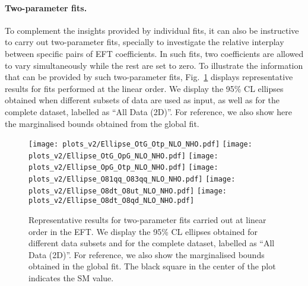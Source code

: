 
\paragraph{Two-parameter fits.}
%
To complement the insights provided by individual fits, it can also be instructive
to carry out two-parameter fits, specially to investigate the relative
interplay between specific pairs of EFT coefficients.
%
In such fits, two coefficients are allowed to vary simultaneously
while the rest are set to zero.
%
To illustrate the information that can be provided
by such two-parameter fits, Fig.~\ref{fig:2Dfits} displays
representative results for fits performed at the linear order.
%
We display the 95\% CL ellipses obtained when different subsets of data are used as input,
as well as for the complete dataset, labelled as ``All Data (2D)''.
%
For reference, we also show here the marginalised bounds obtained
from the global fit.

\begin{figure}[t]
  \begin{center}
    \texttt{[image: plots\_v2/Ellipse\_OtG\_Otp\_NLO\_NHO.pdf]}
    \texttt{[image: plots\_v2/Ellipse\_OtG\_OpG\_NLO\_NHO.pdf]}
    \texttt{[image: plots\_v2/Ellipse\_OpG\_Otp\_NLO\_NHO.pdf]}
    \texttt{[image: plots\_v2/Ellipse\_O81qq\_O83qq\_NLO\_NHO.pdf]}
    \texttt{[image: plots\_v2/Ellipse\_O8dt\_O8ut\_NLO\_NHO.pdf]}
    \texttt{[image: plots\_v2/Ellipse\_O8dt\_O8qd\_NLO\_NHO.pdf]}
    \vspace{-0.2cm}
    \caption{\small Representative results for two-parameter fits carried out
      at linear order in the EFT.
      We display the 95\% CL ellipses obtained for different data subsets
      and for the complete dataset, labelled as ``All Data (2D)''.
      For reference, we also show the marginalised bounds obtained
      in the global fit.
      The black square in the center of the plot indicates the SM value.
     \label{fig:2Dfits} }
  \end{center}
\end{figure}

